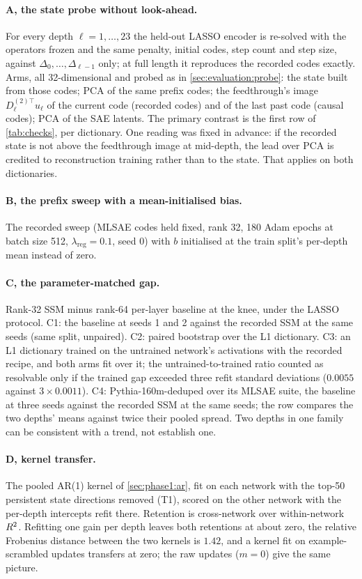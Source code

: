 \paragraph{A, the state probe without look-ahead.} For every depth
$\ell = 1,\dots,23$ the held-out LASSO encoder is re-solved with the
operators frozen and the same penalty, initial codes, step count and step
size, against $\Delta_0,\dots,\Delta_{\ell-1}$ only; at full length it
reproduces the recorded codes exactly. Arms, all 32-dimensional and probed as
in \cref{sec:evaluation:probe}: the state built from those codes; PCA of the
same prefix codes; the feedthrough's image $D^{(2)\top}_\ell u_\ell$ of the
current code (recorded codes) and of the last past code (causal codes); PCA
of the SAE latents. The primary contrast is the first row of
\cref{tab:checks}, per dictionary. One reading was fixed in advance: if the
recorded state is not above the feedthrough image at mid-depth, the lead over
PCA is credited to reconstruction training rather than to the state. That
applies on both dictionaries.

\paragraph{B, the prefix sweep with a mean-initialised bias.} The recorded
sweep (MLSAE codes held fixed, rank 32, 180 Adam epochs at batch size 512,
$\lambda_{\mathrm{reg}} = 0.1$, seed 0) with $b$ initialised at the train
split's per-depth mean instead of zero.

\paragraph{C, the parameter-matched gap.} Rank-32 SSM minus rank-64
per-layer baseline at the knee, under the LASSO protocol. C1: the baseline at
seeds 1 and 2 against the recorded SSM at the same seeds (same split,
unpaired). C2: paired bootstrap over the L1 dictionary. C3: an L1 dictionary
trained on the untrained network's activations with the recorded recipe, and
both arms fit over it; the untrained-to-trained ratio counted as resolvable
only if the trained gap exceeded three refit standard deviations ($0.0055$
against $3 \times 0.0011$). C4: Pythia-160m-deduped over its MLSAE suite, the
baseline at three seeds against the recorded SSM at the same seeds; the row
compares the two depths' means against twice their pooled spread. Two depths
in one family can be consistent with a trend, not establish one.

\paragraph{D, kernel transfer.} The pooled AR(1) kernel of
\cref{sec:phase1:ar}, fit on each network with the top-50 persistent state
directions removed (T1), scored on the other network with the per-depth
intercepts refit there. Retention is cross-network over within-network
$R^2$. Refitting one gain per depth leaves both retentions at about zero,
the relative Frobenius distance between the two kernels is $1.42$, and a
kernel fit on example-scrambled updates transfers at zero; the raw updates
($m = 0$) give the same picture.

